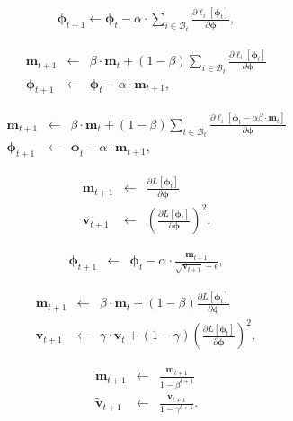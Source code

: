 \documentclass[letterpaper,twoside,openany, titlepage,oldfontcommands,titles,dvipsnames]{memoir}
\begin{document}
\begin{eqnarray}\label{eq:train_sgd}
  \boldsymbol\phi_{t+1}\longleftarrow\boldsymbol\phi_{t} - \alpha \cdot \sum_{i\in\mathcal{B}_{t}}\frac{\partial \ell_{i}[\boldsymbol\phi_{t}]}{\partial \boldsymbol\phi},
 \end{eqnarray}

\begin{eqnarray}\label{eq:train_momentum}
  \mathbf{m}_{t+1} &\leftarrow& \beta \cdot \mathbf{m}_t + (1-\beta) \sum_{i\in\mathcal{B}_t}\frac{\partial \ell_{i}[\boldsymbol\phi_{t}]}{\partial \boldsymbol\phi}\nonumber \\
  \boldsymbol\phi_{t+1} &\leftarrow&\boldsymbol\phi_{t} - \alpha \cdot \mathbf{m}_{t+1},
 \end{eqnarray}

\begin{eqnarray}\label{eq:train_nesterov}
  \mathbf{m}_{t+1} &\leftarrow& \beta \cdot \mathbf{m}_{t} + (1-\beta) \sum_{i\in\mathcal{B}_{t}}\frac{\partial \ell_{i}[\boldsymbol\phi_{t}-\alpha\beta\cdot\mathbf{m}_{t}]}{\partial \boldsymbol\phi}\nonumber \\
  \boldsymbol\phi_{t+1} &\leftarrow&\boldsymbol\phi_{t} - \alpha\cdot \mathbf{m}_{t+1},
 \end{eqnarray}

\begin{eqnarray}
  \mathbf{m}_{t+1} &\leftarrow& \frac{\partial L[\boldsymbol\phi_{t}]}{\partial \boldsymbol\phi}\nonumber \\
  \mathbf{v}_{t+1} &\leftarrow& \left(\frac{\partial L[\boldsymbol\phi_{t}]}{\partial \boldsymbol\phi}\right)^2.
 \end{eqnarray}

\begin{eqnarray}
 \boldsymbol\phi_{t+1} &\leftarrow & \boldsymbol\phi_{t} - \alpha \cdot \frac{\mathbf{m}_{t+1}}{\sqrt{\mathbf{v}_{t+1}}+\epsilon},
 \end{eqnarray}

\begin{eqnarray}\label{eq:train_adam}
  \mathbf{m}_{t+1} &\leftarrow& \beta \cdot \mathbf{m}_{t} + (1-\beta) \frac{\partial L[\boldsymbol\phi_{t}]}{\partial \boldsymbol\phi}\nonumber \\
  \mathbf{v}_{t+1} &\leftarrow& \gamma \cdot \mathbf{v}_{t} + (1-\gamma) \left(\frac{\partial L[\boldsymbol\phi_{t}]}{\partial \boldsymbol\phi}\right)^2,
 \end{eqnarray}

\begin{eqnarray}\label{eq:train_adam_modify}
 \tilde{\mathbf{m}}_{t+1} &\leftarrow & \frac{\mathbf{m}_{t+1}}{1-\beta^{t+1}}\nonumber \\
 \tilde{\mathbf{v}}_{t+1} &\leftarrow & \frac{\mathbf{v}_{t+1}}{1-\gamma^{t+1}}.
 \end{eqnarray}
\end{document}
